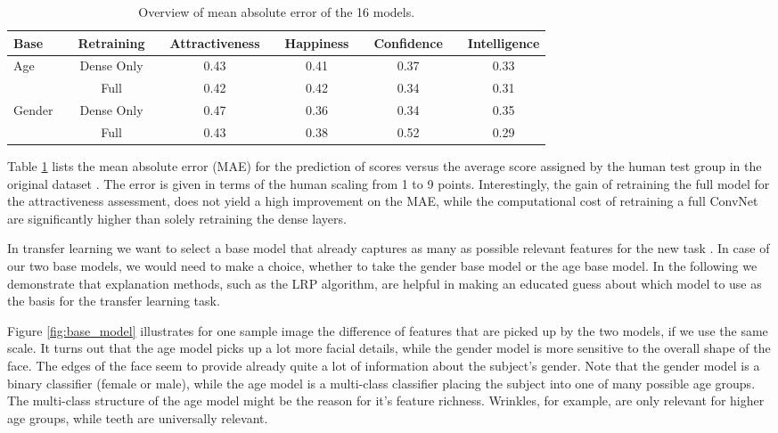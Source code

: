 \documentclass[runningheads]{llncs}
\begin{document}
\begin{table}[t]
\centering
\caption{Overview of mean absolute error of the 16 models.}
\begin{tabular}{lp{0.2cm}cp{0.2cm}cp{0.2cm}cp{0.2cm}cp{0.2cm}c}
Base       & & Retraining      & & Attractiveness & & Happiness & & Confidence & & Intelligence \\
\hline
Age & & Dense Only & & 0.43 & & 0.41 & & 0.37 & & 0.33  \\
    & & Full & & 0.42 & & 0.42 & & 0.34 & & 0.31  \\
\hline
Gender & & Dense Only & & 0.47 & & 0.36 & & 0.34 & & 0.35  \\
    & & Full  & & 0.43 & & 0.38 & & 0.52 & & 0.29 \\ 
\end{tabular}
\label{tab:mae}
\end{table}

Table \ref{tab:mae} lists the mean absolute error (MAE) for the prediction of scores versus the average score assigned by the human test group in the original dataset \cite{bainbridge2013intrinsic}. The error is given in terms of the human scaling from 1 to 9 points.
Interestingly, the gain of retraining the full model for the attractiveness assessment, does not yield a high improvement on the MAE, while the computational cost of retraining a full ConvNet are significantly higher than solely retraining the dense layers.

In transfer learning we want to select a base model that already captures as many as possible relevant features for the new task \cite{pan2010survey}. In case of our two base models, we would need to make a choice, whether to take the gender base model or the age base model. 
In the following we demonstrate that explanation methods, such as the LRP algorithm, are helpful in making an educated guess about which model to use as the basis for the transfer learning task.


Figure \ref{fig:base_model} illustrates for one sample image the difference of features that are picked up by the two models, if we use the same scale. It turns out that the age model picks up a lot more facial details, while the gender model is more sensitive to the overall shape of the face. The edges of the face seem to provide already quite a lot of information about the subject's gender. Note that the gender model is a binary classifier (female or male), while the age model is a multi-class classifier placing the subject into one of many possible age groups.
The multi-class structure of the age model might be the reason for it's feature richness. Wrinkles, for example, are only relevant for higher age groups, while teeth are universally relevant.
\end{document}
